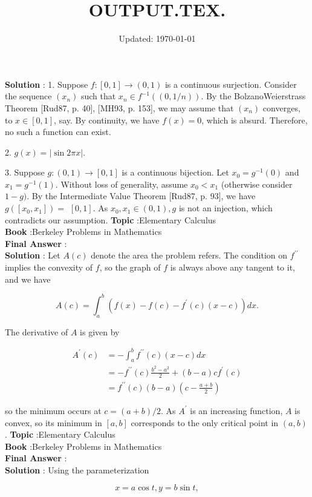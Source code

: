 \documentclass[10pt]{article}
\title{OUTPUT.TEX.}
\date{Updated: \today}
\author{}
\begin{document}
\textbf{Solution} : 1. Suppose $f:[0,1] \rightarrow(0,1)$ is a continuous surjection. Consider the sequence $\left(x_{n}\right)$ such that $x_{n} \in f^{-1}((0,1 / n))$. By the BolzanoWeierstrass Theorem [Rud87, p. 40], [MH93, p. 153], we may assume that $\left(x_{n}\right)$ converges, to $x \in[0,1]$, say. By continuity, we have $f(x)=0$, which is absurd. Therefore, no such a function can exist.

2. $g(x)=|\sin 2 \pi x|$.

3. Suppose $g:(0,1) \rightarrow[0,1]$ is a continuous bijection. Let $x_{0}=g^{-1}(0)$ and $x_{1}=g^{-1}(1)$. Without loss of generality, assume $x_{0}<x_{1}$ (otherwise consider $1-g)$. By the Intermediate Value Theorem [Rud87, p. 93], we have $g\left(\left[x_{0}, x_{1}\right]\right)=$ $[0,1]$. As $x_{0}, x_{1} \in(0,1), g$ is not an injection, which contradicts our assumption.
\textbf{Topic} :Elementary Calculus \\
\textbf{Book} :Berkeley Problems in Mathematics\\
\textbf{Final Answer} :\\


\textbf{Solution} : Let $A(c)$ denote the area the problem refers. The condition on $f^{\prime \prime}$ implies the convexity of $f$, so the graph of $f$ is always above any tangent to it, and we have

$$
A(c)=\int_{a}^{b}\left(f(x)-f(c)-f^{\prime}(c)(x-c)\right) d x .
$$

The derivative of $A$ is given by

$$
\begin{aligned}
A^{\prime}(c) &=-\int_{a}^{b} f^{\prime \prime}(c)(x-c) d x \\
&=-f^{\prime \prime}(c) \frac{b^{2}-a^{2}}{2}+(b-a) c f^{\prime}(c) \\
&=f^{\prime \prime}(c)(b-a)\left(c-\frac{a+b}{2}\right)
\end{aligned}
$$

so the minimum occurs at $c=(a+b) / 2$. As $A^{\prime}$ is an increasing function, $A$ is convex, so its minimum in $[a, b]$ corresponds to the only critical point in $(a, b)$.
\textbf{Topic} :Elementary Calculus \\
\textbf{Book} :Berkeley Problems in Mathematics\\
\textbf{Final Answer} :\\


\textbf{Solution} : Using the parameterization

$$
x=a \cos t, y=b \sin t,
$$
\end{document}
